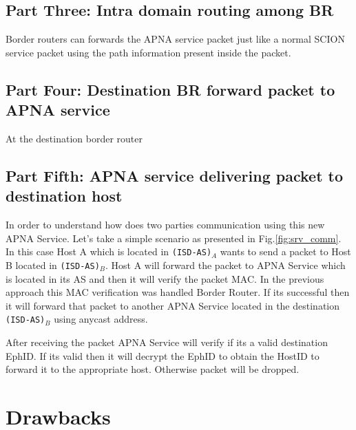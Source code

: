 \subsection{Part Three: Intra domain routing among BR}
Border routers can forwards the APNA service packet just like a normal SCION service packet using the path information present inside the packet.

\subsection{Part Four: Destination BR forward packet to APNA service}
At the destination border router 

\subsection{Part Fifth: APNA service delivering packet to destination host}

In order to understand how does two parties communication using this new APNA Service. Let's take a simple scenario as presented in Fig.\ref{fig:srv_comm}. In this case Host A which is located in \texttt{(ISD-AS)}$_A$ wants to send a packet to Host B located in \texttt{(ISD-AS)}$_B$. Host A will forward the packet to APNA Service which is located in its AS and then it will verify the packet MAC. In the previous approach this MAC verification was handled Border Router. If its successful then it will forward that packet to another APNA Service located in the destination \texttt{(ISD-AS)}$_B$ using anycast address.

After receiving the packet APNA Service will verify if its a valid destination EphID. If its valid then it will decrypt the EphID to obtain the HostID to forward it to the appropriate host. Otherwise packet will be dropped.

\section{Drawbacks}